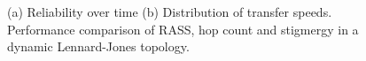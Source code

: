 \begin{figure}
    \centering
    \caption{(a) Reliability over time (b) Distribution of transfer speeds. Performance comparison of RASS, hop count and stigmergy in a dynamic Lennard-Jones topology.}
    \label{results:dynamicTopologyLennard}
    \vspace{-2mm}
\end{figure}

